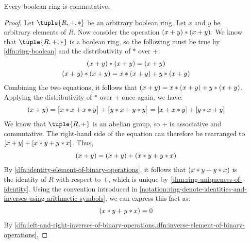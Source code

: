 \begin{thm}
    \label{thm:ring-commutativity-of-boolean-rings}
    Every boolean ring is commutative.
\end{thm}

\begin{proof}
    Let \( \tuple{R,+,\ast} \) be an arbitrary boolean ring. Let \( x \) and \( y \) be arbitrary elements of \( R \).
    Now consider the operation \( \mleft( x + y \mright) \ast \mleft( x + y \mright) \). We know that \( \tuple{R,+,\ast} \)
    is a boolean ring, so the following must be true by \cref{dfn:ring-boolean} and the distributivity of \( \ast \) over \( + \):
    \begin{gather*}
        \mleft( x + y \mright) \ast \mleft( x + y \mright) = \mleft( x + y \mright)\\
        \mleft( x + y \mright) \ast \mleft( x + y \mright) = x \ast \mleft( x + y \mright) + y \ast \mleft( x + y \mright)
    \end{gather*}
    Combining the two equations, it follows that \( \mleft( x + y \mright) = x \ast \mleft( x + y \mright) + y \ast \mleft( x + y \mright) \).
    Applying the distributivity of \( \ast \) over \( + \) once again, we have:
    \begin{equation*}
        \mleft( x + y \mright) = \big[ x \ast x + x \ast y \big] + \big[ y \ast x + y \ast y \big] = \mleft[ x + x \ast y \mright] + \mleft[ y \ast x + y \mright]
    \end{equation*}
    We know that \( \tuple{R,+} \) is an abelian group, so \( + \) is associative and commutative. The right-hand side of the equation can therefore be rearranged to
    \( \mleft[ x + y \mright] + \mleft[ x \ast y + y \ast x \mright] \). Thus,
    \begin{equation*}
        \mleft( x + y \mright) = \mleft( x + y \mright) + \mleft( x \ast y + y \ast x \mright)
    \end{equation*}
    By \cref{dfn:identity-element-of-binary-operations}, it follows that \( \mleft( x \ast y + y \ast x \mright) \) is the identity of \( R \) with respect to \( + \),
    which is unique by \cref{thm:ring-uniqueness-of-identity}. Using the convention introduced in \cref{notation:ring-denote-identities-and-inverses-using-arithmetic-symbols},
    we can express this fact as:
    \begin{equation*}
        \mleft( x \ast y + y \ast x \mright) = 0
    \end{equation*}
    By \cref{dfn:left-and-right-inverses-of-binary-operations,dfn:inverse-element-of-binary-operations},

\end{proof}
